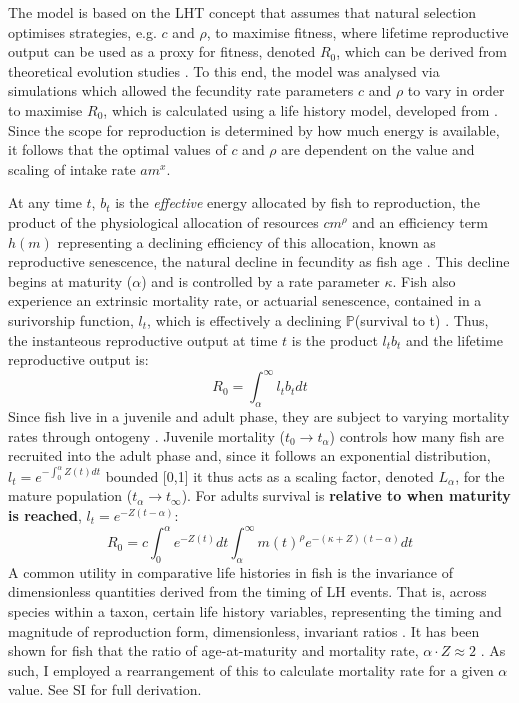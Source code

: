 \documentclass[a4paper]{article} %
\begin{document}
The model is based on the LHT concept that assumes that natural selection optimises strategies, e.g. $c$ and $\rho$, to maximise fitness, where lifetime reproductive output can be used as a proxy for fitness, denoted $R_0$, which can be derived from theoretical evolution studies \autocite{Charnov2001, stearns1992evolution}. To this end, the model was analysed via simulations which allowed the fecundity rate parameters $c$ and $\rho$ to vary in order to maximise $R_0$, which is calculated using a life history model, developed from \cite{Charnov2001}. Since the scope for reproduction is determined by how much energy is available, it follows that the optimal values of $c$ and $\rho$ are dependent on the value and scaling of intake rate $am^{x}$. 

At any time $t$, $b_{t}$ is the \textit{effective} energy allocated by fish to reproduction, the product of the physiological allocation of resources $cm^{\rho}$ and an efficiency term $h(m)$ representing a declining efficiency of this allocation, known as reproductive senescence, the natural decline in fecundity as fish age \autocite{Stearns2000, Benoit2018, Vrtilek2018}. This decline begins at maturity ($\alpha$) and is controlled by a rate parameter $\kappa$. Fish also experience an extrinsic mortality rate, or actuarial senescence, contained in a surivorship function, $l_t$, which is effectively a declining $\mathbb{P}$(survival to t) \autocite{Peterson1984, Charnov1993, Charnov2001, Benoit2018, Laird2010, Reznick2002, Reznick2006}. Thus, the instanteous reproductive output at time $t$ is the product $l_{t}b_{t}$ and the lifetime reproductive output is:
\begin{equation}
    R_{0} = \int_{\alpha}^{\infty}l_{t}b_{t} dt
\end{equation}
Since fish live in a juvenile and adult phase, they are subject to varying mortality rates through ontogeny \autocite{Charnov2001}. Juvenile mortality ($t_0 \rightarrow t_{\alpha}$) controls how many fish are recruited into the adult phase and, since it follows an exponential distribution, $l_t = e^{-\int_{0}^{\alpha}Z(t)dt}$ bounded [0,1] it thus acts as a scaling factor, denoted $L_{\alpha}$, for the mature population ($t_{\alpha} \rightarrow t_{\infty}$). For adults survival is \textbf{relative to when maturity is reached}, $l_{t} = e^{-Z(t-\alpha)}$:
\begin{equation}
    R_{0} = c\int_{0}^{\alpha}e^{-Z(t)}dt\int_{\alpha}^{\infty} m(t)^{\rho} e^{-(\kappa+Z)(t-\alpha)} dt \label{LHT_optimisation}
\end{equation}
A common utility in comparative life histories in fish is the invariance of dimensionless quantities derived from the timing of LH events. That is, across species within a taxon, certain life history variables, representing the timing and magnitude of reproduction form, dimensionless, invariant ratios \autocite{Charnov1993}. It has been shown for fish that the ratio of age-at-maturity and mortality rate, $\alpha\cdot Z \approx 2$ \autocite{Charnov1993}. As such, I employed a rearrangement of this to calculate mortality rate for a given $\alpha$ value.
See SI for full derivation.
\end{document}
